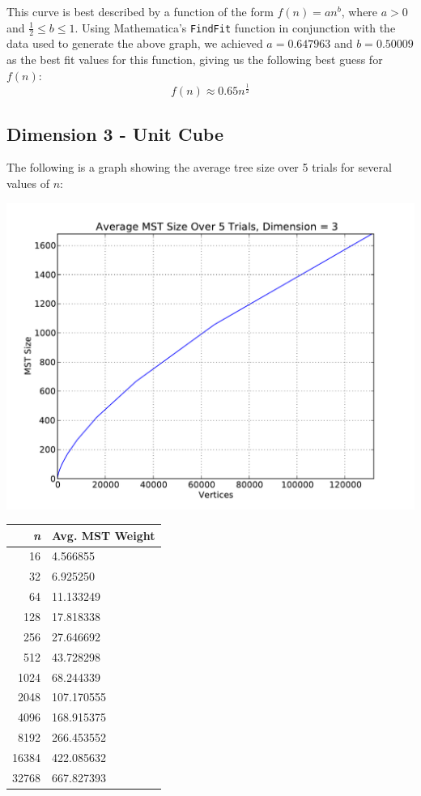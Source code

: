 \documentclass[solution, letterpaper]{cs121}
\begin{document}
This curve is best described by a function of the form $f(n)=an^b$, where $a > 0$ and $\frac{1}{2} \leq b \leq 1$. Using Mathematica's {\tt FindFit} function in conjunction with the data used to generate the above graph, we achieved $a=0.647963$ and $b=0.50009$ as the best fit values for this function, giving us the following best guess for $f(n)$:
\[f(n) \approx 0.65 n^{\frac{1}{2}}\]

\pagebreak

\subsection*{Dimension 3 - Unit Cube}

The following is a graph showing the average tree size over 5 trials for several values of $n$:
\begin{center}
\includegraphics[scale=0.6]{graphs/kruskals-dimension-3.pdf}
\begin{tabular}{ | r | l |}
\hline
\bf{\itshape{n}} & \bf{Avg. MST Weight} \\
\hline
16 & 4.566855 \\
\hline
32 & 6.925250 \\
\hline
64 & 11.133249 \\
\hline
128 & 17.818338 \\
\hline
256 & 27.646692 \\
\hline
512 & 43.728298 \\
\hline
1024 & 68.244339 \\
\hline
2048 & 107.170555 \\
\hline
4096 & 168.915375 \\
\hline
8192 & 266.453552 \\
\hline
16384 & 422.085632\\
\hline
32768 & 667.827393\\
\hline
\end{tabular}
\end{center}
\end{document}
